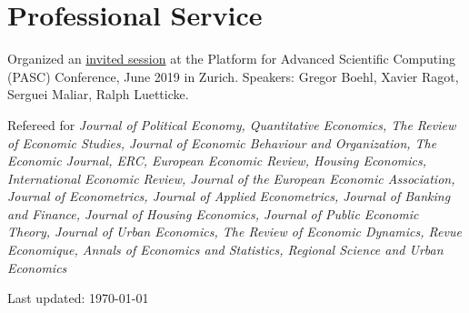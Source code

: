 \documentclass[letterpaper]{article}
\renewenvironment{itemize}{
  \begin{list}{}{
    \setlength{\leftmargin}{1.5em}
  }
}{
  \end{list}
}
\begin{document}
\section*{Professional Service}

\begin{itemize}
\item Organized an \href{https://pasc19.pasc-conference.org/program/schedule/session/?sess=sess124}{invited session} at the Platform for Advanced Scientific Computing (PASC) Conference, June 2019 in Zurich. Speakers: Gregor Boehl, Xavier Ragot, Serguei Maliar, Ralph Luetticke.
\item Refereed for {\it Journal of Political Economy, Quantitative Economics, The Review of Economic Studies, Journal of Economic Behaviour and Organization, The Economic Journal, ERC, European Economic Review, Housing Economics, International Economic Review, Journal of the European Economic Association, Journal of Econometrics, Journal of Applied Econometrics, Journal of Banking and Finance, Journal of Housing Economics, Journal of Public Economic Theory, Journal of Urban Economics, The Review of Economic Dynamics, Revue Economique, Annals of Economics and Statistics, Regional Science and Urban Economics}
\end{itemize}

\bigskip

\begin{center}
  \begin{footnotesize}
    Last updated: \today \\
  \end{footnotesize}
\end{center}
\end{document}
